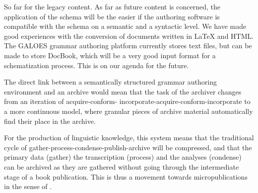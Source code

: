 \documentclass[a4paper,10pt]{article}
\begin{document}
% 
% 

So far for the legacy content. As far as future content is concerned, the application of the schema will be the easier if the authoring software is compatible with the schema on a semantic and a syntactic level. We have made good experiences with the conversion of documents written in LaTeX and HTML. The GALOES grammar authoring platform currently stores text files, but can be made to store DocBook, which will be a very good input format for a schematization process. This is on our agenda for the future.

The direct link between a semantically structured grammar authoring environment and an archive would mean that the task of the archiver changes from an iteration of acquire-conform- incorporate-acquire-conform-incorporate to a more continuous model, where granular pieces of archive material automatically find their place in the archive.

For the production of linguistic knowledge, this system means that the traditional cycle of gather-process-condense-publish-archive will be compressed, and that the primary data (gather) the transcription (process) and the analyses (condense) can be archived as they are gathered without going through the intermediate stage of a book publication. This is thus a movement towards micropublications in the sense of \citet{Cysouw2009micropub}.




\end{document}
